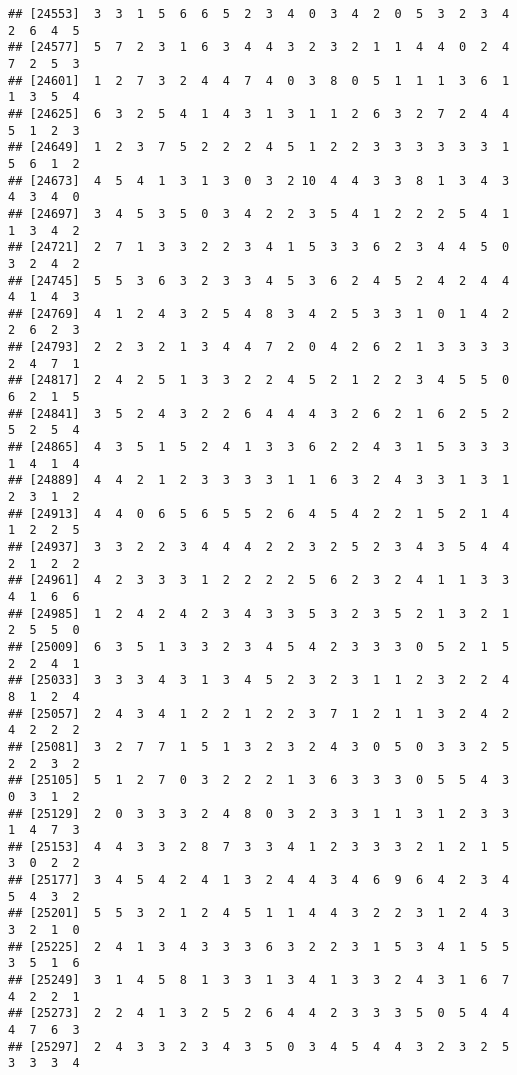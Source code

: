 \documentclass[
]{article}
\begin{document}
\begin{verbatim}
## [24553]  3  3  1  5  6  6  5  2  3  4  0  3  4  2  0  5  3  2  3  4  2  6  4  5
## [24577]  5  7  2  3  1  6  3  4  4  3  2  3  2  1  1  4  4  0  2  4  7  2  5  3
## [24601]  1  2  7  3  2  4  4  7  4  0  3  8  0  5  1  1  1  3  6  1  1  3  5  4
## [24625]  6  3  2  5  4  1  4  3  1  3  1  1  2  6  3  2  7  2  4  4  5  1  2  3
## [24649]  1  2  3  7  5  2  2  2  4  5  1  2  2  3  3  3  3  3  3  1  5  6  1  2
## [24673]  4  5  4  1  3  1  3  0  3  2 10  4  4  3  3  8  1  3  4  3  4  3  4  0
## [24697]  3  4  5  3  5  0  3  4  2  2  3  5  4  1  2  2  2  5  4  1  1  3  4  2
## [24721]  2  7  1  3  3  2  2  3  4  1  5  3  3  6  2  3  4  4  5  0  3  2  4  2
## [24745]  5  5  3  6  3  2  3  3  4  5  3  6  2  4  5  2  4  2  4  4  4  1  4  3
## [24769]  4  1  2  4  3  2  5  4  8  3  4  2  5  3  3  1  0  1  4  2  2  6  2  3
## [24793]  2  2  3  2  1  3  4  4  7  2  0  4  2  6  2  1  3  3  3  3  2  4  7  1
## [24817]  2  4  2  5  1  3  3  2  2  4  5  2  1  2  2  3  4  5  5  0  6  2  1  5
## [24841]  3  5  2  4  3  2  2  6  4  4  4  3  2  6  2  1  6  2  5  2  5  2  5  4
## [24865]  4  3  5  1  5  2  4  1  3  3  6  2  2  4  3  1  5  3  3  3  1  4  1  4
## [24889]  4  4  2  1  2  3  3  3  3  1  1  6  3  2  4  3  3  1  3  1  2  3  1  2
## [24913]  4  4  0  6  5  6  5  5  2  6  4  5  4  2  2  1  5  2  1  4  1  2  2  5
## [24937]  3  3  2  2  3  4  4  4  2  2  3  2  5  2  3  4  3  5  4  4  2  1  2  2
## [24961]  4  2  3  3  3  1  2  2  2  2  5  6  2  3  2  4  1  1  3  3  4  1  6  6
## [24985]  1  2  4  2  4  2  3  4  3  3  5  3  2  3  5  2  1  3  2  1  2  5  5  0
## [25009]  6  3  5  1  3  3  2  3  4  5  4  2  3  3  3  0  5  2  1  5  2  2  4  1
## [25033]  3  3  3  4  3  1  3  4  5  2  3  2  3  1  1  2  3  2  2  4  8  1  2  4
## [25057]  2  4  3  4  1  2  2  1  2  2  3  7  1  2  1  1  3  2  4  2  4  2  2  2
## [25081]  3  2  7  7  1  5  1  3  2  3  2  4  3  0  5  0  3  3  2  5  2  2  3  2
## [25105]  5  1  2  7  0  3  2  2  2  1  3  6  3  3  3  0  5  5  4  3  0  3  1  2
## [25129]  2  0  3  3  3  2  4  8  0  3  2  3  3  1  1  3  1  2  3  3  1  4  7  3
## [25153]  4  4  3  3  2  8  7  3  3  4  1  2  3  3  3  2  1  2  1  5  3  0  2  2
## [25177]  3  4  5  4  2  4  1  3  2  4  4  3  4  6  9  6  4  2  3  4  5  4  3  2
## [25201]  5  5  3  2  1  2  4  5  1  1  4  4  3  2  2  3  1  2  4  3  3  2  1  0
## [25225]  2  4  1  3  4  3  3  3  6  3  2  2  3  1  5  3  4  1  5  5  3  5  1  6
## [25249]  3  1  4  5  8  1  3  3  1  3  4  1  3  3  2  4  3  1  6  7  4  2  2  1
## [25273]  2  2  4  1  3  2  5  2  6  4  4  2  3  3  3  5  0  5  4  4  4  7  6  3
## [25297]  2  4  3  3  2  3  4  3  5  0  3  4  5  4  4  3  2  3  2  5  3  3  3  4

\end{verbatim}
\end{document}
